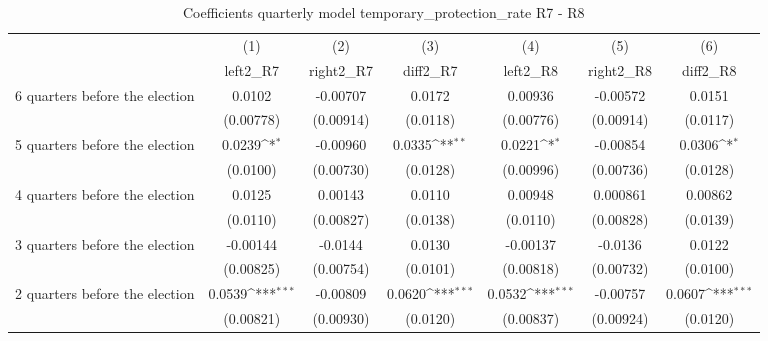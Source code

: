 \begin{table}[htbp]\centering
\def\sym#1{\ifmmode^{#1}\else\(^{#1}\)\fi}
\caption{Coefficients quarterly model temporary\_protection\_rate R7 - R8}
\begin{tabular}{l*{6}{c}}
\hline\hline
                    &\multicolumn{1}{c}{(1)}&\multicolumn{1}{c}{(2)}&\multicolumn{1}{c}{(3)}&\multicolumn{1}{c}{(4)}&\multicolumn{1}{c}{(5)}&\multicolumn{1}{c}{(6)}\\
                    &\multicolumn{1}{c}{left2\_R7}&\multicolumn{1}{c}{right2\_R7}&\multicolumn{1}{c}{diff2\_R7}&\multicolumn{1}{c}{left2\_R8}&\multicolumn{1}{c}{right2\_R8}&\multicolumn{1}{c}{diff2\_R8}\\
\hline
 6 quarters before the election&      0.0102         &    -0.00707         &      0.0172         &     0.00936         &    -0.00572         &      0.0151         \\
                    &   (0.00778)         &   (0.00914)         &    (0.0118)         &   (0.00776)         &   (0.00914)         &    (0.0117)         \\
[1em]
 5 quarters before the election&      0.0239\sym{*}  &    -0.00960         &      0.0335\sym{**} &      0.0221\sym{*}  &    -0.00854         &      0.0306\sym{*}  \\
                    &    (0.0100)         &   (0.00730)         &    (0.0128)         &   (0.00996)         &   (0.00736)         &    (0.0128)         \\
[1em]
 4 quarters before the election&      0.0125         &     0.00143         &      0.0110         &     0.00948         &    0.000861         &     0.00862         \\
                    &    (0.0110)         &   (0.00827)         &    (0.0138)         &    (0.0110)         &   (0.00828)         &    (0.0139)         \\
[1em]
 3 quarters before the election&    -0.00144         &     -0.0144         &      0.0130         &    -0.00137         &     -0.0136         &      0.0122         \\
                    &   (0.00825)         &   (0.00754)         &    (0.0101)         &   (0.00818)         &   (0.00732)         &    (0.0100)         \\
[1em]
 2 quarters before the election&      0.0539\sym{***}&    -0.00809         &      0.0620\sym{***}&      0.0532\sym{***}&    -0.00757         &      0.0607\sym{***}\\
                    &   (0.00821)         &   (0.00930)         &    (0.0120)         &   (0.00837)         &   (0.00924)         &    (0.0120)         \\

\end{tabular}
\end{table}
